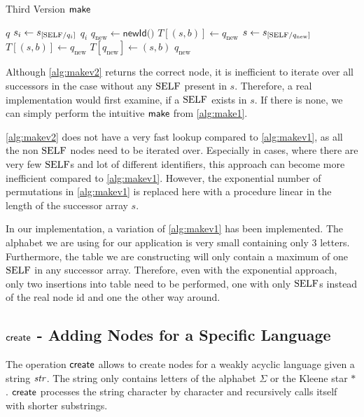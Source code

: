 \begin{algorithm}[H]
\caption{Third Version $\operatorname{\textsf{make}}$}\label{alg:makev2}
\begin{algorithmic}[1]
\Return $q$
\EndIf
{}
\State $s_{i} \gets s_{[\mathrm{SELF} / q_{i}]}$
\Return $q_{i}$
\EndIf
\EndFor
\State $q_{\text{new}} \gets \textsf{newId()}$
\State $T[(s,b)] \gets q_{\text{new}}$
\State $s \gets s_{[\mathrm{SELF} / q_{\text{new}}]}$
\State $T[(s,b)] \gets q_{\text{new}}$
\State $T[q_{\text{new}}] \gets (s,b)$
\Return $q_{\text{new}}$
\end{algorithmic}
\end{algorithm}


Although \autoref{alg:makev2} returns the correct node, it is inefficient to iterate over all successors in the case without any $\mathrm{SELF}$ present in $s$. Therefore, a real implementation would first examine, if a $\mathrm{SELF}$ exists in $s$. If there is none, we can simply perform the intuitive $\operatorname{\textsf{make}}$ from \autoref{alg:make1}.
\par 
\autoref{alg:makev2} does not have a very fast lookup compared to \autoref{alg:makev1}, as all the non $\mathrm{SELF}$ nodes need to be iterated over. Especially in cases, where there are very few $\mathrm{SELF}$s and lot of different identifiers, this approach can become more inefficient compared to \autoref{alg:makev1}. However, the exponential number of permutations in \autoref{alg:makev1} is replaced here with a procedure linear in the length of the successor array $s$.
\par 
In our implementation, a variation of \autoref{alg:makev1} has been implemented. The alphabet we are using for our application is very small containing only 3 letters. Furthermore, the table we are constructing will only contain a maximum of one $\mathrm{SELF}$ in any successor array. Therefore, even with the exponential approach, only two insertions into table need to be performed, one with only $\mathrm{SELF}$s instead of the real node id and one the other way around.

\subsection{$\operatorname{\textsf{create}}$ - Adding Nodes for a Specific Language}\label{sec:create}
The operation $\operatorname{\textsf{create}}$ allows to create nodes for a weakly acyclic language given a string $\mathit{str}$. The string only contains letters of the alphabet $\Sigma$ or the Kleene star $*$. $\operatorname{\textsf{create}}$ processes the string character by character and recursively calls itself with shorter substrings. 

